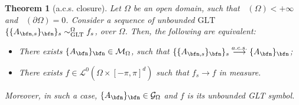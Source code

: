 \documentclass{amsart}
\newtheorem{thm}{Theorem}[section]
\DeclareMathOperator{\Ld}{\mathcal{L}^d}
\begin{document}
\begin{thm}[a.c.s. closure]\label{thm_acs_closure}
    Let $\Omega$ be an open domain, such that $\Ld(\Omega)<+\infty$ and $\Ld(\partial\Omega)=0$. Consider a sequence of unbounded $\mathrm{GLT}$ $\{\{A_{\bfn,s}\}_\bfn\}_s\sim_{\mathrm{GLT}}^{\Omega}f_s$, over $\Omega$. Then, the following are equivalent:
    \begin{itemize}
        \item[(i)]\label{thm_acs_closure_item_i} There exists $\{A_\bfn\}_\bfn\in\mathcal{M}_\Omega$, such that $\{\{A_{\bfn,s}\}_\bfn\}_s\overset{a.c.s.}{\longrightarrow}\{A_\bfn\}_\bfn$; 
        \item[(ii)]\label{thm_acs_closure_item_ii} There exists $f\in\mathcal{L}^0(\Omega\times[-\pi,\pi]^d)$ such that $f_s\to f$ in measure.
    \end{itemize}
    Moreover, in such a case, $\{A_\bfn\}_\bfn\in\mathcal{G}_\Omega$ and $f$ is its unbounded GLT symbol.
\end{thm}
\end{document}
